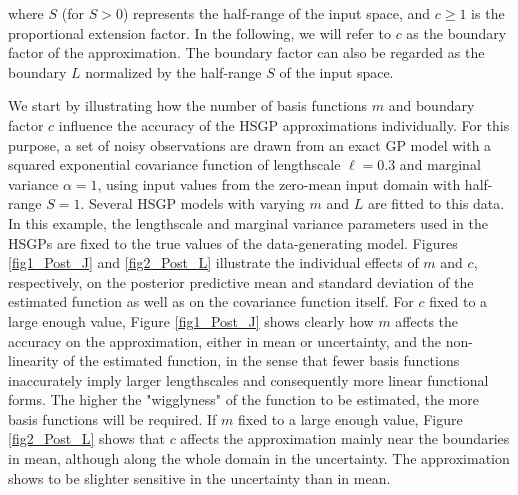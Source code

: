 \documentclass[onecolumn,a4paper,11pt]{article}
\begin{document}
\noindent where $S$ (for $S > 0$) represents the half-range of the input space, and $c \geq 1$ is the proportional extension factor. In the following, we will refer to $c$ as the boundary factor of the approximation. The boundary factor can also be regarded as the boundary $L$ normalized by the half-range $S$ of the input space.

We start by illustrating how the number of basis functions $m$ and boundary factor $c$ influence the accuracy of the HSGP approximations individually. For this purpose, a set of noisy observations are drawn from an exact GP model with a squared exponential covariance function of lengthscale $\ell=0.3$ and marginal variance $\alpha=1$, using input values from the zero-mean input domain with half-range $S=1$. Several HSGP models with varying $m$ and $L$ are fitted to this data. In this example, the lengthscale and marginal variance parameters used in the HSGPs are fixed to the true values of the data-generating model. 
Figures \ref{fig1_Post_J} and \ref{fig2_Post_L} illustrate the individual effects of $m$ and $c$, respectively, on the posterior predictive mean and standard deviation of the estimated function as well as on the covariance function itself. For $c$ fixed to a large enough value, Figure \ref{fig1_Post_J} shows clearly how $m$ affects the accuracy on the approximation, either in mean or uncertainty, and the non-linearity of the estimated function, in the sense that fewer basis functions inaccurately imply larger lengthscales and consequently more linear functional forms.
The higher the "wigglyness" of the function to be estimated, the more basis functions will be required. If $m$ fixed to a large enough value, Figure \ref{fig2_Post_L} shows that $c$ affects the approximation mainly near the boundaries in mean, although along the whole domain in the uncertainty. The approximation shows to be slighter sensitive in the uncertainty than in mean.
\end{document}
